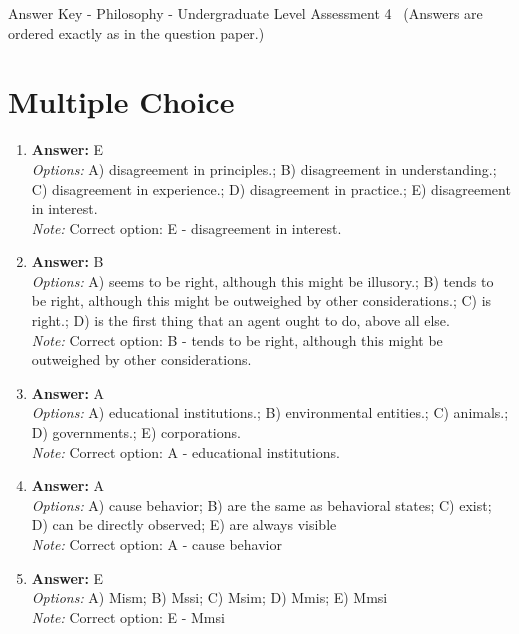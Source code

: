 \documentclass[12pt]{article}
\begin{document}
\begin{center}
Answer Key - Philosophy - Undergraduate Level Assessment 4 \
\small (Answers are ordered exactly as in the question paper.)
\end{center}

\section*{Multiple Choice}
\begin{enumerate}[label=\arabic*.]
\item \textbf{Answer:} E
\\ \textit{Options:} A) disagreement in principles.; B) disagreement in understanding.; C) disagreement in experience.; D) disagreement in practice.; E) disagreement in interest.
\\ \textit{Note:} Correct option: E - disagreement in interest.
\item \textbf{Answer:} B
\\ \textit{Options:} A) seems to be right, although this might be illusory.; B) tends to be right, although this might be outweighed by other considerations.; C) is right.; D) is the first thing that an agent ought to do, above all else.
\\ \textit{Note:} Correct option: B - tends to be right, although this might be outweighed by other considerations.
\item \textbf{Answer:} A
\\ \textit{Options:} A) educational institutions.; B) environmental entities.; C) animals.; D) governments.; E) corporations.
\\ \textit{Note:} Correct option: A - educational institutions.
\item \textbf{Answer:} A
\\ \textit{Options:} A) cause behavior; B) are the same as behavioral states; C) exist; D) can be directly observed; E) are always visible
\\ \textit{Note:} Correct option: A - cause behavior
\item \textbf{Answer:} E
\\ \textit{Options:} A) Mism; B) Mssi; C) Msim; D) Mmis; E) Mmsi
\\ \textit{Note:} Correct option: E - Mmsi
\end{enumerate}
\end{document}

